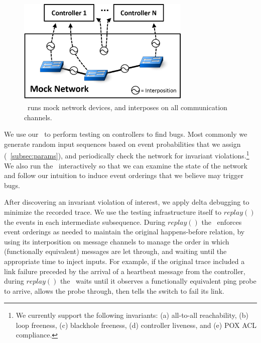\begin{figure}[tb]
    \includegraphics[width=3.25in]{../diagrams/architecture/Debugger_Architecture.png}
    \caption[]{\label{fig:architecture} \projectname~runs mock
    network devices, and interposes on all communication
    channels.}
    \vspace{-1em}
\end{figure}

We use our \tester~to perform testing on controllers to find
bugs. Most commonly we generate random input
sequences based on event probabilities that we assign (\cf~\ref{subsec:params}), and periodically
check the network for invariant violations.\footnote{We currently support the following invariants:
  (a) all-to-all reachability, (b) loop freeness, (c) blackhole freeness, (d) controller
liveness, and (e) POX ACL compliance.
}
We also run the \tester~interactively
so that we can examine the state of the network
and follow our intuition to induce event orderings that we believe may trigger bugs.

 After discovering an invariant
violation of interest, we apply delta debugging to minimize the recorded trace. We use the
testing infrastructure itself to $replay()$ the events in each intermediate subsequence.
During $replay()$ the \tester~enforces event orderings as needed to maintain the original happens-before
relation, by using its interposition on message channels to
manage the order in which (functionally equivalent) messages are let through,
and waiting until the appropriate time to inject inputs. For example, if the
original trace included a link failure preceded by the arrival of a heartbeat
message from the controller, during $replay()$ the \tester~waits until it observes
a functionally equivalent ping probe to arrive, allows the probe
through, then tells the switch to fail its link. %

